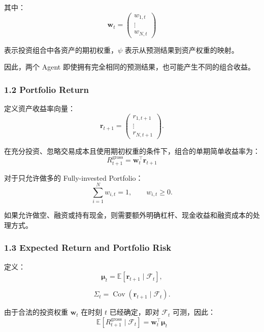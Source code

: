 其中：
\[\boldsymbol w_t=
\begin{pmatrix}
w_{1,t}\\
\vdots\\
w_{N,t}
\end{pmatrix}\]

表示投资组合中各资产的期初权重，\(\psi\) 表示从预测结果到资产权重的映射。


因此，两个 Agent 即使拥有完全相同的预测结果，也可能产生不同的组合收益。

\hypertarget{part-4-67-0001-portfolio-return}{%
\subsubsection{1.2 Portfolio Return}\label{part-4-67-0001-portfolio-return}}

定义资产收益率向量：
\[\boldsymbol r_{t+1}
=
\begin{pmatrix}
r_{1,t+1}\\
\vdots\\
r_{N,t+1}
\end{pmatrix}.\]

在充分投资、忽略交易成本且使用期初权重的条件下，组合的单期简单收益率为：
\[\boxed{
R_{t+1}^{\mathrm{gross}}
=
\boldsymbol w_t^\top\boldsymbol r_{t+1}
}\]

对于只允许做多的 Fully-invested Portfolio：
\[\sum_{i=1}^{N}w_{i,t}=1,
\qquad
w_{i,t}\geq0.\]

如果允许做空、融资或持有现金，则需要额外明确杠杆、现金收益和融资成本的处理方式。

\hypertarget{part-4-67-0001-expected-return-and-portfolio-risk}{%
\subsubsection{1.3 Expected Return and Portfolio Risk}\label{part-4-67-0001-expected-return-and-portfolio-risk}}

定义：
\[\boldsymbol\mu_t
=
\mathbb E[\boldsymbol r_{t+1}\mid\mathcal F_t],\]

\[\Sigma_t
=
\operatorname{Cov}(\boldsymbol r_{t+1}\mid\mathcal F_t).\]

由于合法的投资权重 \(\boldsymbol w_t\) 在时刻 \(t\) 已经确定，即对 \(\mathcal F_t\) 可测，因此：
\[\boxed{
\mathbb E[R_{t+1}^{\mathrm{gross}}\mid\mathcal F_t]
=
\boldsymbol w_t^\top\boldsymbol\mu_t
}\]

